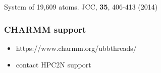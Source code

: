 \documentclass{beamer}
\begin{document}
\begin{frame}
\begin{minipage}[t]{0.48\linewidth}
\begin{figure}
\end{figure}
\end{minipage}

System of 19,609 atoms. JCC, {\bf 35}, 406-413 (2014)

\end{frame}

\begin{frame}
\frametitle{CHARMM support}
\begin{itemize}
	\item https://www.charmm.org/ubbthreads/
	\item contact HPC2N support
\end{itemize}
\end{frame}
\end{document}
